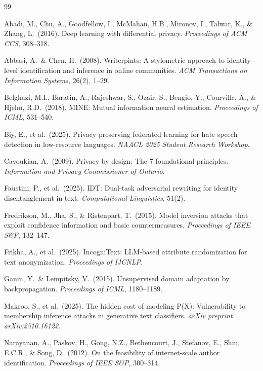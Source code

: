 \documentclass{article}
\begin{document}
{\small
\begin{thebibliography}{99}

  Abadi, M., Chu, A., Goodfellow, I., McMahan, H.B., Mironov, I., Talwar, K.,
  \& Zhang, L.\ (2016).
  Deep learning with differential privacy.
  {\it Proceedings of ACM CCS}, 308--318.

  Abbasi, A.\ \& Chen, H.\ (2008).
  Writerpints: A stylometric approach to identity-level identification and
  inference in online communities.
  {\it ACM Transactions on Information Systems}, 26(2), 1--29.

  Belghazi, M.I., Baratin, A., Rajeshwar, S., Ozair, S., Bengio, Y.,
  Courville, A., \& Hjelm, R.D.\ (2018).
  MINE: Mutual information neural estimation.
  {\it Proceedings of ICML}, 531--540.

  Biy, E., et al.\ (2025).
  Privacy-preserving federated learning for hate speech detection in
  low-resource languages.
  {\it NAACL 2025 Student Research Workshop}.

  Cavoukian, A.\ (2009).
  Privacy by design: The 7 foundational principles.
  {\it Information and Privacy Commissioner of Ontario}.

  Faustini, P., et al.\ (2025).
  IDT: Dual-task adversarial rewriting for identity disentanglement in
  text.
  {\it Computational Linguistics}, 51(2).

  Fredrikson, M., Jha, S., \& Ristenpart, T.\ (2015).
  Model inversion attacks that exploit confidence information and basic
  countermeasures.
  {\it Proceedings of IEEE S\&P}, 132--147.

  Frikha, A., et al.\ (2025).
  IncogniText: LLM-based attribute randomization for text anonymization.
  {\it Proceedings of IJCNLP}.

  Ganin, Y.\ \& Lempitsky, V.\ (2015).
  Unsupervised domain adaptation by backpropagation.
  {\it Proceedings of ICML}, 1180--1189.

  Makroo, S., et al.\ (2025).
  The hidden cost of modeling P(X): Vulnerability to membership inference
  attacks in generative text classifiers.
  {\it arXiv preprint arXiv:2510.16122}.

  Narayanan, A., Paskov, H., Gong, N.Z., Bethencourt, J., Stefanov, E.,
  Shin, E.C.R., \& Song, D.\ (2012).
  On the feasibility of internet-scale author identification.
  {\it Proceedings of IEEE S\&P}, 300--314.


\end{thebibliography}}
\end{document}
